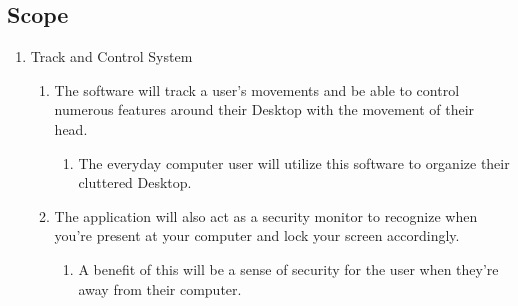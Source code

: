 \documentclass[titlepage]{article}
\begin{document}

\subsection{Scope}
\begin{enumerate}
	\item Track and Control System
  \begin{enumerate}
  	\item The software will track a user's movements and be able to control numerous features around their Desktop with the movement of their head.
  	\begin{enumerate} 	 	
  		\item The everyday computer user will utilize this software to organize their cluttered Desktop.  	
  	\end{enumerate}
  	\item The application will also act as a security monitor to recognize when you're present at your computer and lock your screen accordingly.
  	\begin{enumerate}
  		\item A benefit of this will be a sense of security for the user when they're away from their computer.
  	\end{enumerate}
  \end{enumerate} 
\end{enumerate}
\end{document}
